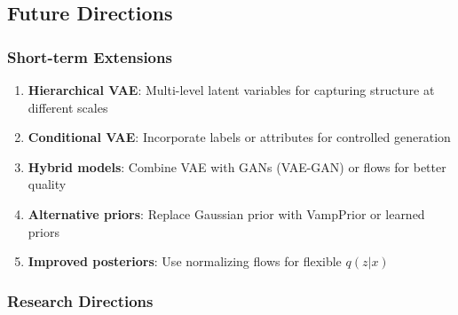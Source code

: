 \documentclass[conference]{IEEEtran}
\begin{document}
\subsection{Future Directions}

\subsubsection{Short-term Extensions}

\begin{enumerate}
    \item \textbf{Hierarchical VAE}: Multi-level latent variables for capturing structure at different scales
    
    \item \textbf{Conditional VAE}: Incorporate labels or attributes for controlled generation
    
    \item \textbf{Hybrid models}: Combine VAE with GANs (VAE-GAN) or flows for better quality
    
    \item \textbf{Alternative priors}: Replace Gaussian prior with VampPrior or learned priors
    
    \item \textbf{Improved posteriors}: Use normalizing flows for flexible $q(z|x)$
\end{enumerate}

\subsubsection{Research Directions}
\end{document}
